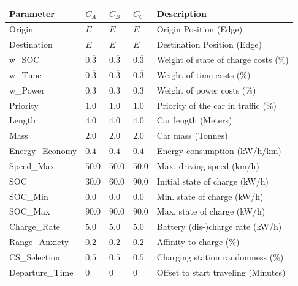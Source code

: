 \begin{table}[h]
	\renewcommand{\arraystretch}{1.3}
	\centering
	\begin{tabularx}{\columnwidth}{llllX}
		\hline
		\textbf{Parameter}          & \textbf{$C_{A}$} & \textbf{$C_{B}$}  & \textbf{$C_{C}$}           & \textbf{Description} \\ \hline
		Origin                      & $E$     & $E$ & $E$    & Origin Position (Edge)      \\
		Destination                 & $E$    & $E$  & $E$     & Destination Position (Edge) \\
		w\_SOC              & $0.\overline{3}$  & $0.\overline{3}$ & $0.\overline{3}$ & Weight of state of charge costs (\%)                   \\
		w\_Time              & $0.\overline{3}$ & $0.\overline{3}$ & $0.\overline{3}$ & Weight of time costs (\%)                     \\
		w\_Power             & $0.\overline{3}$ & $0.\overline{3}$ & $0.\overline{3}$ & Weight of power costs (\%)                      \\
		Priority                  & $1.0$ & $1.0$ & $1.0$ & Priority of the car in traffic (\%)                  \\
		Length                    & $4.0$ & $4.0$ & $4.0$ & Car length (Meters)            \\
		Mass                   & $2.0$ & $2.0$ & $2.0$ & Car mass  (Tonnes)                 \\
		Energy\_Economy				& $0.4$ & $0.4$ & $0.4$ & Energy consumption (kW/h/km) \\
		Speed\_Max				& $50.0$ & $50.0$ & $50.0$ & Max. driving speed (km/h) \\
		SOC                      & $30.0$ & $60.0$ & $90.0$ & Initial state of charge (kW/h)                   \\
		SOC\_Min               & $0.0$ & $0.0$ & $0.0$ & Min. state of charge (kW/h)                     \\
		SOC\_Max              & $90.0$ & $90.0$ & $90.0$ & Max. state of charge (kW/h)                      \\
		Charge\_Rate          & $5.0$ & $5.0$ & $5.0$ & Battery (dis-)charge rate (kW/h)                    \\
		Range\_Anxiety         & $0.2$ & $0.2$ & $0.2$ & Affinity to charge (\%)                     \\
		CS\_Selection		   & $0.5$ & $0.5$ & $0.5$ & Charging station randomness (\%)                    \\ 
		Departure\_Time 	& $0$ & $0$ & $0$ & Offset to start traveling (Minutes)                   \\ \hline
	\end{tabularx}
\end{table}


